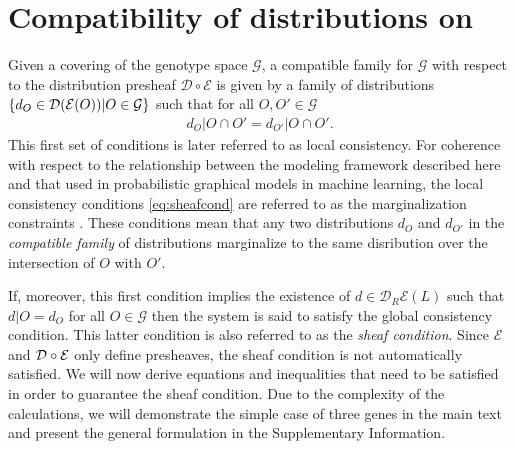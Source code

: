 \section{Compatibility of distributions on \gnpm{}}\label{sec:compatibilityofgpms}
Given a covering of the genotype space $\mathcal{G}$, a compatible family for $\mathcal{G}$ with respect to the distribution presheaf $\mathcal{D} \circ \mathcal{E}$ is given by a family of distributions $\{d_O \in \mathcal{D} (\mathcal{E}(O)) | O \in \mathcal{G}\}$ such that for all $O, O' \in \mathcal{G}$
\begin{eqnarray}\label{eq:sheafcond}
d_O|O \cap O' = d_{O'}|O \cap O'.
\end{eqnarray}
This first set of conditions is later referred to as local consistency. For coherence with respect to the relationship between the modeling framework described here and that used in probabilistic graphical models in machine learning, the local consistency conditions \ref{eq:sheafcond} are referred to as the marginalization constraints \cite{Wainwright2007}.  These conditions mean that any two distributions $d_O$ and $d_{O'}$ in the \emph{compatible family} of distributions marginalize to the same disribution over the intersection of $O$ with $O'$.

If, moreover, this first condition implies the existence of $d \in \mathcal{D}_R \mathcal{E}(L)$ such that $d|O = d_O$ for all $O \in \mathcal{G}$ then the system is said to satisfy the global consistency condition.  This latter condition is also referred to as the \emph{sheaf condition}.  Since $\mathcal{E}$ and $\mathcal{D} \circ \mathcal{E}$ only define presheaves, the sheaf condition is not automatically satisfied.  We will now derive equations and inequalities that need to be satisfied in order to guarantee the sheaf condition.  Due to the complexity of the calculations, we will demonstrate the simple case of three genes in the main text and present the general formulation in the Supplementary Information.

